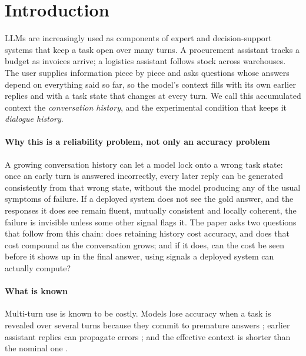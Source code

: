 \section{Introduction}
\label{sec:introduction}

LLMs are increasingly used as components of expert and decision-support
systems that keep a task open over many turns. A procurement assistant tracks a
budget as invoices arrive; a logistics assistant follows stock across
warehouses. The user supplies information piece by piece and asks questions
whose answers depend on everything said so far, so the model's context fills
with its own earlier replies and with a task state that changes at every turn.
We call this accumulated context the \emph{conversation history}, and the
experimental condition that keeps it \emph{dialogue history}.

\paragraph{Why this is a reliability problem, not only an accuracy problem}
A growing conversation history can let a model lock onto a wrong task state:
once an early turn is answered incorrectly, every later reply can be generated
consistently from that wrong state, without the model producing any of the
usual symptoms of failure. If a deployed system does not see the gold answer,
and the responses it does see remain fluent, mutually consistent and locally
coherent, the failure is invisible unless some other signal flags it. The paper
asks two questions that follow from this chain: does retaining history cost
accuracy, and does that cost compound as the conversation grows; and if it
does, can the cost be seen before it shows up in the final answer, using
signals a deployed system can actually compute?

\paragraph{What is known}
Multi-turn use is known to be costly. Models lose accuracy when a task is
revealed over several turns because they commit to premature answers
\citep{laban2025lost}; earlier assistant replies can propagate errors
\citep{huang2026benefit}; and the effective context is shorter than the
nominal one \citep{liu2024lost,hsieh2024ruler}.

